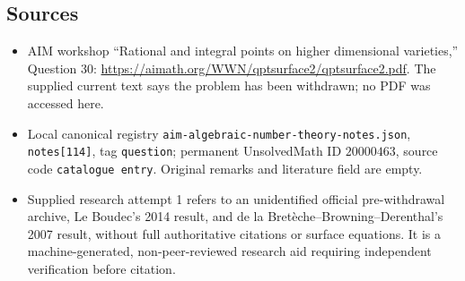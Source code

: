 \documentclass[11pt]{article}
\begin{document}
\subsection{Sources}
\begin{itemize}
\item AIM workshop ``Rational and integral points on higher dimensional varieties,'' Question 30: \url{https://aimath.org/WWN/qptsurface2/qptsurface2.pdf}. The supplied current text says the problem has been withdrawn; no PDF was accessed here.
\item Local canonical registry \texttt{aim-algebraic-number-theory-notes.json}, \texttt{notes[114]}, tag \texttt{question}; permanent UnsolvedMath ID \(20000463\), source code \texttt{catalogue entry}. Original remarks and literature field are empty.
\item Supplied research attempt 1 refers to an unidentified official pre-withdrawal archive, Le Boudec's 2014 result, and de la Bret\`eche--Browning--Derenthal's 2007 result, without full authoritative citations or surface equations. It is a machine-generated, non-peer-reviewed research aid requiring independent verification before citation.
\end{itemize}
\end{document}
